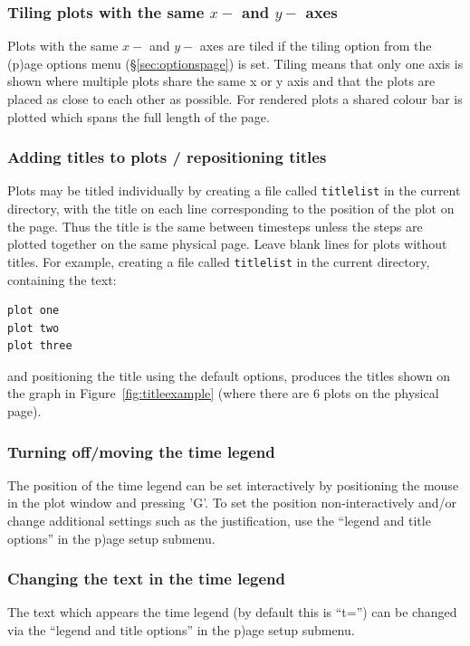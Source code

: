 \documentclass[a4paper,11pt]{article}
\begin{document}
\subsubsection{ Tiling plots with the same $x-$ and $y-$ axes}
\label{sec:tiling}
 Plots with the same $x-$ and $y-$ axes are tiled if the tiling
option from the (p)age options menu (\S\ref{sec:optionspage}) is set. Tiling means that only one axis is shown where multiple plots share the same x or y axis and that the plots are placed as close to each other as possible. For rendered plots a shared colour bar is plotted which spans the full length of the page.

\subsubsection{ Adding titles to plots / repositioning titles}
\label{sec:title}
 Plots may be titled individually by creating a file called \verb+titlelist+ in
the current directory, with the title on each line corresponding to the position
of the plot on the page. Thus the title is the same between timesteps unless the
steps are plotted together on the same physical page. Leave blank lines for
plots without titles. For example, creating a file called \verb+titlelist+ in
the current directory, containing the text:
\begin{verbatim}
plot one
plot two
plot three
\end{verbatim}
and positioning the title using the default options, produces the titles shown
on the graph in Figure~\ref{fig:titleexample} (where there are 6 plots on the physical page).

\subsubsection{ Turning off/moving the time legend}
\label{sec:legendoff}
 The position of the time legend can be set interactively by positioning the mouse in the plot window and pressing 'G'. To set the position non-interactively and/or change additional settings such as the justification, use the ``legend and title options'' in the p)age setup submenu.

\subsubsection{ Changing the text in the time legend}
\label{sec:timelegendtext}
 The text which appears the time legend (by default this is ``t='') can be changed via the ``legend and title options'' in the p)age setup submenu.
\end{document}
